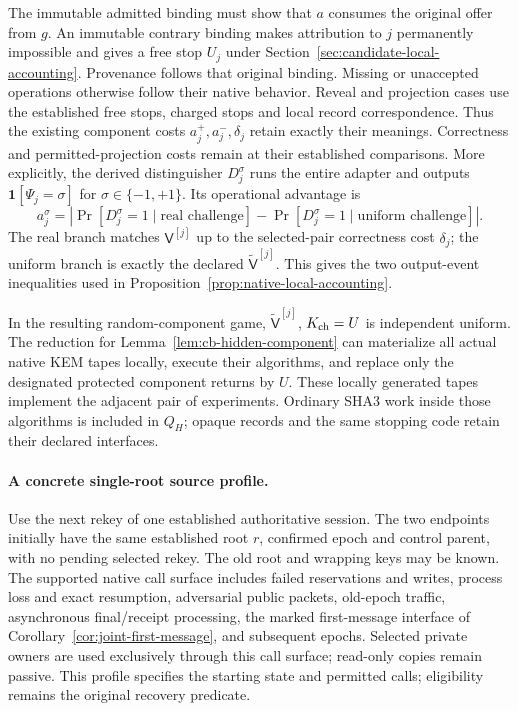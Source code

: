 The immutable admitted binding must show that $a$ consumes the original
offer from $g$. An immutable contrary binding makes attribution to $j$
permanently impossible and gives a free stop $U_j$ under
Section~\ref{sec:candidate-local-accounting}. Provenance follows that
original binding. Missing or unaccepted operations otherwise follow their
native behavior. Reveal and projection cases use the established free
stops, charged stops and local record correspondence. Thus the existing
component costs $a_j^+,a_j^-,\delta_j$ retain exactly their meanings.
Correctness and permitted-projection costs remain at their established
comparisons.
More explicitly, the derived distinguisher $D_j^\sigma$ runs the entire
adapter and outputs $\mathbf1[\Psi_j=\sigma]$ for
$\sigma\in\{-1,+1\}$. Its operational advantage is
\[
 a_j^\sigma=\left|\Pr[D_j^\sigma=1\mid\text{real challenge}]
                    -\Pr[D_j^\sigma=1\mid\text{uniform challenge}]\right|.
\]
The real branch matches $\mathsf V^{[j]}$ up to the selected-pair
correctness cost $\delta_j$; the uniform branch is exactly the declared
$\widetilde{\mathsf V}^{[j]}$. This gives the two output-event
inequalities used in Proposition~\ref{prop:native-local-accounting}.

In the resulting random-component game,
$\widetilde{\mathsf V}^{[j]}$, $K_{\rm ch}=U$ is independent uniform.
The reduction for Lemma~\ref{lem:cb-hidden-component} can materialize all
actual native KEM tapes locally, execute their algorithms, and replace
only the designated protected component returns by $U$. These locally
generated tapes implement the adjacent pair of experiments. Ordinary SHA3 work
inside those algorithms is included in $Q_H$; opaque records and the same
stopping code retain their declared interfaces.

\paragraph{A concrete single-root source profile.}
Use the next rekey of one established authoritative session. The two
endpoints initially have the same established root $r$, confirmed epoch
and control parent, with no pending selected rekey. The old root and
wrapping keys may be known. The supported native call surface includes
failed reservations and writes, process loss and exact resumption,
adversarial public packets, old-epoch traffic, asynchronous final/receipt
processing, the marked first-message interface of
Corollary~\ref{cor:joint-first-message}, and subsequent epochs. Selected
private owners are used exclusively through this call surface; read-only
copies remain passive.
This profile specifies the starting state and permitted calls; eligibility
remains the original recovery predicate.

